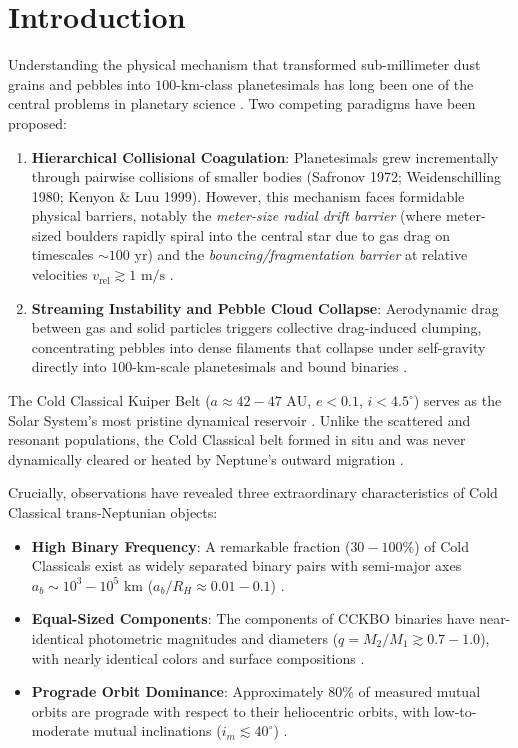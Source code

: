 \documentclass[11pt,a4paper]{article}
\begin{document}
\section{Introduction}
Understanding the physical mechanism that transformed sub-millimeter dust grains and pebbles into $100\text{-km}$-class planetesimals has long been one of the central problems in planetary science \cite{youdin2005,chiang2010,johansen2014}. Two competing paradigms have been proposed:
\begin{enumerate}
    \item \textbf{Hierarchical Collisional Coagulation}: Planetesimals grew incrementally through pairwise collisions of smaller bodies (Safronov 1972; Weidenschilling 1980; Kenyon \& Luu 1999). However, this mechanism faces formidable physical barriers, notably the \textit{meter-size radial drift barrier} (where meter-sized boulders rapidly spiral into the central star due to gas drag on timescales $\sim 100\text{ yr}$) and the \textit{bouncing/fragmentation barrier} at relative velocities $v_{\text{rel}} \gtrsim 1\text{ m/s}$ \cite{weidenschilling1977,blum2008}.
    \item \textbf{Streaming Instability and Pebble Cloud Collapse}: Aerodynamic drag between gas and solid particles triggers collective drag-induced clumping, concentrating pebbles into dense filaments that collapse under self-gravity directly into $100\text{-km}$-scale planetesimals and bound binaries \cite{youdin2005,johansen2007,simon2016,nesvorny2019}.
\end{enumerate}

The Cold Classical Kuiper Belt ($a \approx 42 - 47\text{ AU}$, $e < 0.1$, $i < 4.5^\circ$) serves as the Solar System's most pristine dynamical reservoir \cite{gladman2008,parker2010}. Unlike the scattered and resonant populations, the Cold Classical belt formed in situ and was never dynamically cleared or heated by Neptune's outward migration \cite{morbidelli2008,nesvorny2015}.

Crucially, observations have revealed three extraordinary characteristics of Cold Classical trans-Neptunian objects:
\begin{itemize}
    \item \textbf{High Binary Frequency}: A remarkable fraction ($30 - 100\%$) of Cold Classicals exist as widely separated binary pairs with semi-major axes $a_b \sim 10^3 - 10^5\text{ km}$ ($a_b / R_H \approx 0.01 - 0.1$) \cite{noll2008,grundy2019}.
    \item \textbf{Equal-Sized Components}: The components of CCKBO binaries have near-identical photometric magnitudes and diameters ($q = M_2 / M_1 \gtrsim 0.7 - 1.0$), with nearly identical colors and surface compositions \cite{benecchi2009}.
    \item \textbf{Prograde Orbit Dominance}: Approximately $80\%$ of measured mutual orbits are prograde with respect to their heliocentric orbits, with low-to-moderate mutual inclinations ($i_m \lesssim 40^\circ$) \cite{grundy2019}.
\end{itemize}
\end{document}
